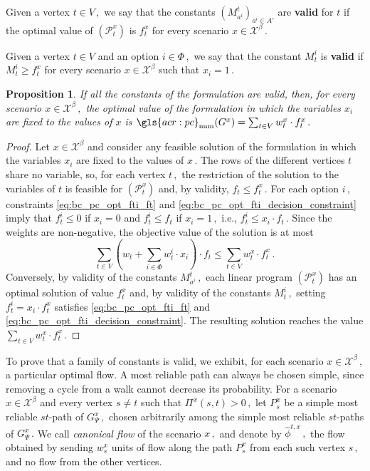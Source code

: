 \documentclass[11pt,a4paper]{report}
\newtheorem{proposition}[theorem]{Proposition}
\theoremstyle{definition}
\theoremstyle{remark}
\begin{document}
\begin{timportantbox}
  Given a vertex $t \in V\,,$ we say that the constants $(M^t_{a^i})_{a^i \in A'}$ are \textbf{valid} for $t$ if the optimal value of $(\mathcal{P}^x_t)$ is $f^x_t$ for every scenario $x \in \mathcal{X}^\beta\,.$

  Given a vertex $t \in V$ and an option $i \in \Phi\,,$ we say that the constant $M^i_t$ is \textbf{valid} if $M^i_t \geq f^x_t$ for every scenario $x \in \mathcal{X}^\beta$ such that $x_i = 1\,.$
\end{timportantbox}

\begin{proposition}\label{prop:big_m_exactness}
  If all the constants of the formulation are valid, then, for every scenario $x \in \mathcal{X}^\beta\,,$ the optimal value of the formulation in which the variables $x_i$ are fixed to the values of $x$ is $\gls{acr:pc}_{\text{num}}(G^x) = \sum_{t \in V} w^x_t \cdot f^x_t\,.$
\end{proposition}

\begin{proof}
  Let $x \in \mathcal{X}^\beta$ and consider any feasible solution of the formulation in which the variables $x_i$ are fixed to the values of $x\,.$ The rows of the different vertices $t$ share no variable, so, for each vertex $t\,,$ the restriction of the solution to the variables of $t$ is feasible for $(\mathcal{P}^x_t)$ and, by validity, $f_t \leq f^x_t\,.$ For each option $i\,,$ constraints \eqref{eq:bc_pc_opt_fti_ft} and \eqref{eq:bc_pc_opt_fti_decision_constraint} imply that $f^i_t \leq 0$ if $x_i = 0$ and $f^i_t \leq f_t$ if $x_i = 1\,,$ i.e., $f^i_t \leq x_i \cdot f_t\,.$ Since the weights are non-negative, the objective value of the solution is at most
  \begin{equation}
    \sum_{t \in V} \left(w_t + \sum_{i \in \Phi} w^i_t \cdot x_i\right) \cdot f_t \leq \sum_{t \in V} w^x_t \cdot f^x_t\,.
  \end{equation}
  Conversely, by validity of the constants $M^t_{a^i}\,,$ each linear program $(\mathcal{P}^x_t)$ has an optimal solution of value $f^x_t$ and, by validity of the constants $M^i_t\,,$ setting $f^i_t = x_i \cdot f^x_t$ satisfies \eqref{eq:bc_pc_opt_fti_ft} and \eqref{eq:bc_pc_opt_fti_decision_constraint}. The resulting solution reaches the value $\sum_{t \in V} w^x_t \cdot f^x_t\,.$
\end{proof}

To prove that a family of constants is valid, we exhibit, for each scenario $x \in \mathcal{X}^\beta\,,$ a particular optimal flow. A most reliable path can always be chosen simple, since removing a cycle from a walk cannot decrease its probability. For a scenario $x \in \mathcal{X}^\beta$ and every vertex $s \neq t$ such that $\Pi^x(s,t) > 0\,,$ let $P^x_s$ be a simple most reliable $st$-path of $G^x_\Psi\,,$ chosen arbitrarily among the simple most reliable $st$-paths of $G^x_\Psi\,.$ We call \textit{canonical flow} of the scenario $x\,,$ and denote by $\hat{\phi}^{t,x}\,,$ the flow obtained by sending $w^x_s$ units of flow along the path $P^x_s$ from each such vertex $s\,,$ and no flow from the other vertices.
\end{document}
